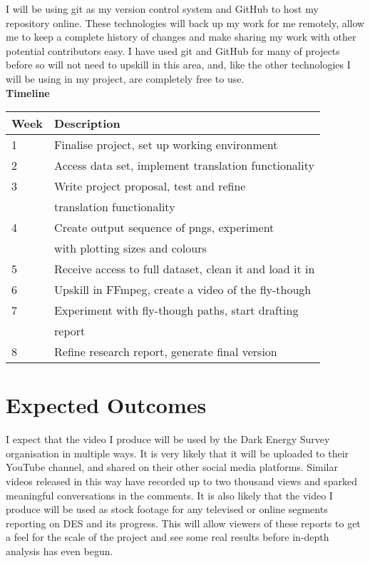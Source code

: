 \documentclass[pra, reprint, A4 paper, bibnotes]{revtex4-1}
\begin{document}
I will be using git as my version control system and GitHub to host my repository online. These technologies will back up my work for me remotely, allow me to keep a complete history of changes and make sharing my work with other potential contributors easy. I have used git and GitHub for many of projects before so will not need to upskill in this area, and, like the other technologies I will be using in my project, are completely free to use.\\

\textbf{Timeline}

\begin{table}[H]
\begin{tabular}{ll}
\hline
Week & Description                                                                                             \\\hline
1    & Finalise project, set up working environment\\
2    & Access data set, implement translation functionality                                      \\
3    & Write project proposal, test and refine \\&translation functionality                                  \\
4    & Create output sequence of pngs, experiment  \\&with plotting sizes and colours                              \\
5    & Receive access to full dataset, clean it and load it in                                                 \\
6    & Upskill in FFmpeg, create a video of the fly-though                                                     \\
7    & Experiment with fly-though paths, start drafting \\&report                                                 \\
8    & Refine research report, generate final version      \\\hline                                                   
\end{tabular}
\end{table}
            
\section{Expected Outcomes}
I expect that the video I produce will be used by the Dark Energy Survey organisation in multiple ways. It is very likely that it will be uploaded to their YouTube channel, and shared on their other social media platforms. Similar videos released in this way have recorded up to two thousand views and sparked meaningful conversations in the comments. It is also likely that the video I produce will be used as stock footage for any televised or online segments reporting on DES and its progress. This will allow viewers of these reports to get a feel for the scale of the project and see some real results before in-depth analysis has even begun.\\
\end{document}
